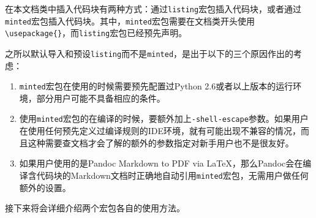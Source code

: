 在本文档类中插入代码块有两种方式：通过\texttt{listing}宏包插入代码块，或者通过\texttt{minted}宏包插入代码块。其中，\texttt{minted}宏包需要在文档类开头使用\texttt{\textbackslash usepackage\{\}}，而\texttt{listing}宏包已经预先声明。

\begin{remark}
  之所以默认导入和预设\texttt{listing}而不是\texttt{minted}，是出于以下的三个原因作出的考虑：
  \begin{enumerate}
    \item \texttt{minted}宏包在使用的时候需要预先配置过Python 2.6或者以上版本的运行环境，部分用户可能不具备相应的条件。
    \item 使用\texttt{minted}宏包的在编译的时候，要额外加上\texttt{-shell-escape}参数。如果用户在使用任何预先定义过编译规则的IDE环境，就有可能出现不兼容的情况，而且这种需要查文档才会了解的额外的参数指定对新手用户也不是很友好。
    \item 如果用户使用的是Pandoc Markdown to PDF via \LaTeX{}，那么Pandoc会在编译含代码块的Markdown文档时正确地自动引用\texttt{minted}宏包，无需用户做任何额外的设置。
  \end{enumerate}
\end{remark}

接下来将会详细介绍两个宏包各自的使用方法。